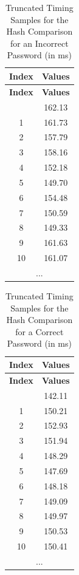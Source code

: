 \begin{longtable}{|c|c|}
\caption{Truncated Timing Samples for the Hash Comparison for an Incorrect Password (in ms)}
\label{table:non_matching_pass_res}
\hline
\rowcolor{grey!15}
\textbf{Index} & \textbf{Values}      \\ \hline
\endfirsthead
\hline
\rowcolor{grey!15}
\textbf{Index} & \textbf{Values}      \\ \hline
\endhead
\hline
\endfoot
\hline
\endlastfoot
0              & 162.13    \\ \hline
1              & 161.73   \\ \hline
2              & 157.79   \\ \hline
3              & 158.16   \\ \hline
4              & 152.18    \\ \hline
5              & 149.70   \\ \hline
6              & 154.48   \\ \hline
7              & 150.59   \\ \hline
8              & 149.33   \\ \hline
9              & 161.63    \\ \hline
10             & 161.07   \\ \hline
\multicolumn{2}{|c|}{...}             \\ \hline
\end{longtable}



\begin{longtable}{|c|c|}
\caption{Truncated Timing Samples for the Hash Comparison for a Correct Password (in ms)}
\label{table:matching_pass_res}
\hline
\rowcolor{grey!15}
\textbf{Index} & \textbf{Values}      \\ \hline
\endfirsthead
\hline
\rowcolor{grey!15}
\textbf{Index} & \textbf{Values}      \\ \hline
\endhead
\hline
\endfoot
\hline
\endlastfoot
0              & 142.11    \\ \hline
1              & 150.21   \\ \hline
2              & 152.93    \\ \hline
3              & 151.94   \\ \hline
4              & 148.29   \\ \hline
5              & 147.69   \\ \hline
6              & 148.18   \\ \hline
7              & 149.09    \\ \hline
8              & 149.97   \\ \hline
9              & 150.53   \\ \hline
10             & 150.41   \\ \hline
\multicolumn{2}{|c|}{...}             \\ \hline
\end{longtable}


